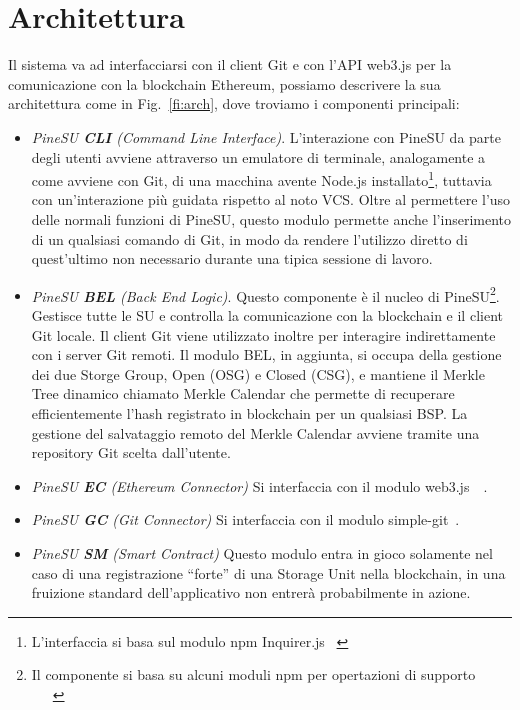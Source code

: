 \section {Architettura}
\indent
Il sistema va ad interfacciarsi con il client Git e con l’API \textsf{web3.js} per la comunicazione
con la blockchain Ethereum, possiamo descrivere la sua architettura come in Fig.~\ref{fi:arch}, dove troviamo i componenti principali:
\begin{itemize}
    \item \emph{PineSU \textbf{CLI} (Command Line Interface)}. L’interazione con PineSU da parte degli utenti avviene attraverso un emulatore di terminale, analogamente a come avviene con Git, di una macchina avente Node.js installato\footnote{L’interfaccia si basa sul modulo npm Inquirer.js ~\cite{inquirer-github-21}}, tuttavia con un’interazione più guidata rispetto al noto VCS. Oltre al permettere l’uso delle normali funzioni di PineSU, questo modulo permette anche l’inserimento di un qualsiasi comando di Git, in modo da rendere l’utilizzo diretto di quest’ultimo non necessario durante una tipica sessione di lavoro.
    \item \emph{PineSU \textbf{BEL} (Back End Logic)}. Questo componente è il nucleo di PineSU\footnote{Il componente si basa su alcuni moduli npm per opertazioni di supporto ~\cite{adm-zip-github-21}~\cite{chalk-github-21}~\cite{merkle-tools-github-21}}. Gestisce tutte le SU e controlla la comunicazione con la blockchain e il client Git locale.
    Il client Git viene utilizzato inoltre per interagire indirettamente con i server Git remoti.
    Il modulo BEL, in aggiunta, si occupa della gestione dei due Storge Group, Open (OSG) e Closed (CSG), e
    mantiene il Merkle Tree dinamico chiamato Merkle Calendar che permette di recuperare efficientemente
    l’hash registrato in blockchain per un qualsiasi BSP. La gestione del salvataggio remoto del Merkle Calendar avviene tramite una repository Git scelta dall’utente.
    \item \emph{PineSU \textbf{EC} (Ethereum Connector)} Si interfaccia con il modulo \textsf{web3.js}~\cite{web3js-github-21}~\cite{web3js-doc-21}. 
    \item \emph{PineSU \textbf{GC} (Git Connector)} Si interfaccia con il modulo \textsf{simple-git}~\cite{simple-git-github-21}. 
    \item \emph{PineSU \textbf{SM} (Smart Contract)} Questo modulo entra in gioco solamente nel caso di una registrazione “forte” di una Storage Unit nella blockchain, in una fruizione standard dell’applicativo non entrerà probabilmente in azione.
\end{itemize}

